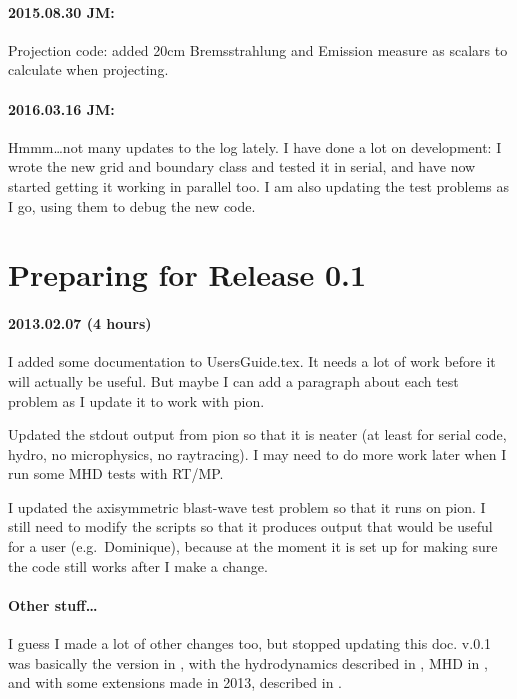 \documentclass[a4paper,11pt]{article}
\begin{document}
\paragraph{2015.08.30 JM:}
Projection code: added 20cm Bremsstrahlung and Emission measure as scalars to calculate when projecting.

\paragraph{2016.03.16 JM:}
Hmmm\ldots not many updates to the log lately.
I have done a lot on \pion{} development: I wrote the new grid and boundary class and tested it in serial, and have now started getting it working in parallel too.
I am also updating the test problems as I go, using them to debug the new code.


\section{Preparing for Release 0.1}
\paragraph{2013.02.07 (4 hours)}
I added some documentation to UsersGuide.tex.
It needs a lot of work before it will actually be useful.
But maybe I can add a paragraph about each test problem as I update it to work with pion.

Updated the stdout output from pion so that it is neater (at least for serial code, hydro, no microphysics, no raytracing).  I may need to do more work later when I run some MHD tests with RT/MP.

I updated the axisymmetric blast-wave test problem so that it runs on pion.
I still need to modify the scripts so that it produces output that would be useful for a user (e.g.\ Dominique), because at the moment it is set up for making sure the code still works after I make a change.

\paragraph{Other stuff\ldots}
I guess I made a lot of other changes too, but stopped updating this doc.
\pion{} v.0.1 was basically the version in \citet{Mac12}, with the hydrodynamics described in \citet{MacLim10}, MHD in \citet{MacLim11}, and with some extensions made in 2013, described in \citet{MacLanGva13}.





\end{document}
